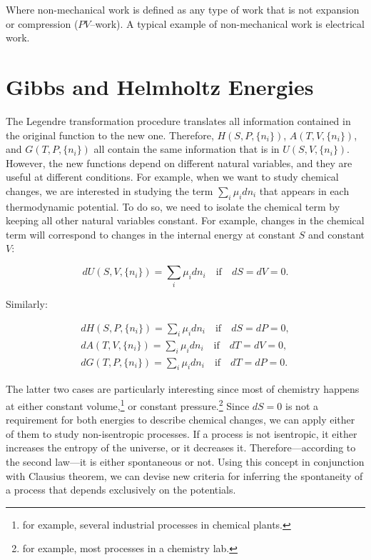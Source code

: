 \documentclass[
  9pt,
]{extbook}
\theoremstyle{definition}
\theoremstyle{definition}
\theoremstyle{definition}
\theoremstyle{definition}
\theoremstyle{remark}
\begin{document}
Where non-mechanical work is defined as any type of work that is not expansion or compression (\(PV\)--work). A typical example of non-mechanical work is electrical work.

\section{Gibbs and Helmholtz Energies}\label{freeenergies}

The Legendre transformation procedure translates all information contained in the original function to the new one. Therefore, \(H(S,P,\{n_i\})\), \(A(T,V,\{n_i\})\), and \(G(T,P,\{n_i\})\) all contain the same information that is in \(U(S,V,\{n_i\})\). However, the new functions depend on different natural variables, and they are useful at different conditions. For example, when we want to study chemical changes, we are interested in studying the term \(\sum_i\mu_i dn_i\) that appears in each thermodynamic potential. To do so, we need to isolate the chemical term by keeping all other natural variables constant. For example, changes in the chemical term will correspond to changes in the internal energy at constant \(S\) and constant \(V\):

\begin{equation}
dU(S,V,\{n_i\}) = \sum_i\mu_i dn_i \quad \text{if} \quad dS=dV=0.
\label{eq:duchem}
\end{equation}

Similarly:

\begin{equation}
\begin{aligned}
dH(S,P,\{n_i\}) = \sum_i\mu_i dn_i \quad \text{if} \quad dS=dP=0, \\
dA(T,V,\{n_i\}) = \sum_i\mu_i dn_i \quad \text{if} \quad dT=dV=0, \\
dG(T,P,\{n_i\}) = \sum_i\mu_i dn_i \quad \text{if} \quad dT=dP=0.
\end{aligned}
\label{eq:dhagchem}
\end{equation}

The latter two cases are particularly interesting since most of chemistry happens at either constant volume,\footnote{for example, several industrial processes in chemical plants.} or constant pressure.\footnote{for example, most processes in a chemistry lab.} Since \(dS=0\) is not a requirement for both energies to describe chemical changes, we can apply either of them to study non-isentropic processes. If a process is not isentropic, it either increases the entropy of the universe, or it decreases it. Therefore---according to the second law---it is either spontaneous or not. Using this concept in conjunction with Clausius theorem, we can devise new criteria for inferring the spontaneity of a process that depends exclusively on the potentials.
\end{document}
